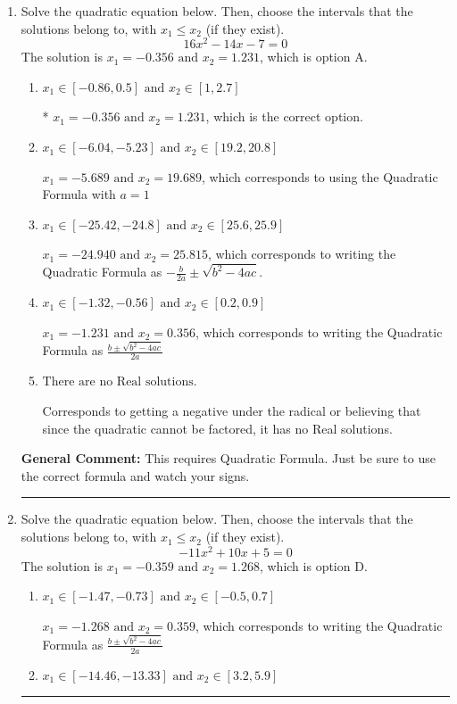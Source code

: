 \documentclass{extbook}[14pt]
\newcommand{\litem}[1]{\item #1

\rule{\textwidth}{0.4pt}}
\begin{document}
\begin{enumerate}\litem{
Solve the quadratic equation below. Then, choose the intervals that the solutions belong to, with $x_1 \leq x_2$ (if they exist).
\[ 16x^{2} -14 x -7 = 0 \]
The solution is \( x_1 = -0.356 \text{ and } x_2 = 1.231 \), which is option A.\begin{enumerate}[label=\Alph*.]
\item \( x_1 \in [-0.86, 0.5] \text{ and } x_2 \in [1, 2.7] \)

* $x_1 = -0.356 \text{ and } x_2 = 1.231$, which is the correct option.
\item \( x_1 \in [-6.04, -5.23] \text{ and } x_2 \in [19.2, 20.8] \)

 $x_1 = -5.689 \text{ and } x_2 = 19.689$, which corresponds to using the Quadratic Formula with $a=1$
\item \( x_1 \in [-25.42, -24.8] \text{ and } x_2 \in [25.6, 25.9] \)

 $x_1 = -24.940 \text{ and } x_2 = 25.815$, which corresponds to writing the Quadratic Formula as $-\frac{b}{2a} \pm \sqrt{b^2 - 4ac}$.
\item \( x_1 \in [-1.32, -0.56] \text{ and } x_2 \in [0.2, 0.9] \)

 $x_1 = -1.231 \text{ and } x_2 = 0.356$, which corresponds to writing the Quadratic Formula as $\frac{b \pm \sqrt{b^2 - 4ac}}{2a}$
\item \( \text{There are no Real solutions.} \)

Corresponds to getting a negative under the radical or believing that since the quadratic cannot be factored, it has no Real solutions.
\end{enumerate}

\textbf{General Comment:} This requires Quadratic Formula. Just be sure to use the correct formula and watch your signs.
}
\litem{
Solve the quadratic equation below. Then, choose the intervals that the solutions belong to, with $x_1 \leq x_2$ (if they exist).
\[ -11x^{2} +10 x + 5 = 0 \]
The solution is \( x_1 = -0.359 \text{ and } x_2 = 1.268 \), which is option D.\begin{enumerate}[label=\Alph*.]
\item \( x_1 \in [-1.47, -0.73] \text{ and } x_2 \in [-0.5, 0.7] \)

 $x_1 = -1.268 \text{ and } x_2 = 0.359$, which corresponds to writing the Quadratic Formula as $\frac{b \pm \sqrt{b^2 - 4ac}}{2a}$
\item \( x_1 \in [-14.46, -13.33] \text{ and } x_2 \in [3.2, 5.9] \)


\end{enumerate}}
\end{enumerate}
\end{document}
